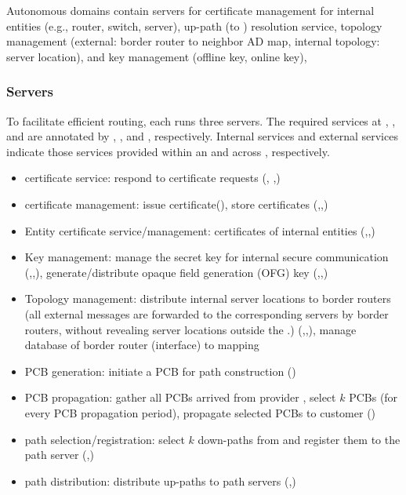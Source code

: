  Autonomous domains contain servers for certificate management for internal entities (e.g., router, switch, server), up-path (to \ISDC) resolution service, topology management (external: border router to neighbor AD map, internal topology: server location), and key management (offline key, online key), 

\subsubsection{Servers}
To facilitate efficient routing, each \AD runs three servers. The required services at \ISDC \AD, \TRAN \AD, and \STUB \AD are annotated by \CAD, \TAD, and \EAD, respectively. Internal services and external services indicate those services provided within an \AD and across \ADs, respectively.

\begin{itemize}
\item \AD certificate service: respond to certificate requests (\CAD, \TAD,\EAD) 
\item \AD certificate management: issue certificate(\CAD), store certificates (\CAD,\TAD,\EAD)
\item Entity certificate service/management: certificates of internal entities (\CAD,\TAD,\EAD)  
\item Key management: manage the secret key for internal secure communication (\CAD,\TAD,\EAD), generate/distribute opaque field generation (OFG) key (\CAD,\TAD,\EAD) 
\item Topology management: distribute internal server locations to border routers (all external messages are forwarded to the corresponding servers by border routers, without revealing server locations outside the \AD.) (\CAD,\TAD,\EAD), manage database of border router (interface) to \AD mapping
\end{itemize}

\begin{itemize}
\item PCB generation: initiate a PCB for path construction (\CAD)
\item PCB propagation: gather all PCBs arrived from provider \ADs, select $k$ PCBs (for every PCB propagation period), propagate selected PCBs to customer \ADs (\TAD)
\item path selection/registration: select $k$ down-paths from \ISDC and register them to the \ISDC path server (\TAD,\EAD)
\item path distribution: distribute up-paths to path servers (\TAD,\EAD) 
\end{itemize}

